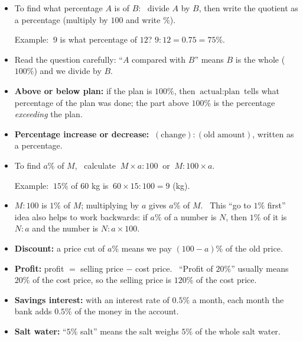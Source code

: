 \begin{knowbox}\begin{itemize}[leftmargin=1.4em,itemsep=3pt]
\item To find what percentage $A$ is of $B$: \ divide $A$ by $B$, then write the quotient as a percentage (multiply by $100$ and write $\%$).\par
Example: $\ 9$ is what percentage of $12$? \quad $9:12=0.75=75\%$.
\item Read the question carefully: ``$A$ compared with $B$'' means $B$ is the whole ($100\%$) and we divide by $B$.
\item \textbf{Above or below plan:} if the plan is $100\%$, then $\ \text{actual}:\text{plan}$ tells what percentage of the plan was done; the part above $100\%$ is the percentage \emph{exceeding} the plan.
\item \textbf{Percentage increase or decrease:} $\ (\text{change}):(\text{old amount})$, written as a percentage.
\end{itemize}
\end{knowbox}
\gap
{}
\begin{knowbox}\begin{itemize}[leftmargin=1.4em,itemsep=3pt]
\item To find $a\%$ of $M$, \ calculate $\ M\times a:100\ $ or $\ M:100\times a$.\par
Example: $\ 15\%$ of $60$ kg is $\ 60\times15:100=9$ (kg).
\item $M:100$ is $1\%$ of $M$; multiplying by $a$ gives $a\%$ of $M$. \ This ``go to $1\%$ first'' idea also helps to work backwards: if $a\%$ of a number is $N$, then $1\%$ of it is $N:a$ and the number is $N:a\times100$.
\end{itemize}
\end{knowbox}
\gap
{}
\begin{knowbox}\begin{itemize}[leftmargin=1.4em,itemsep=3pt]
\item \textbf{Discount:} a price cut of $a\%$ means we pay $(100-a)\%$ of the old price.
\item \textbf{Profit:} profit $=$ selling price $-$ cost price. \ ``Profit of $20\%$'' usually means $20\%$ of the cost price, so the selling price is $120\%$ of the cost price.
\item \textbf{Savings interest:} with an interest rate of $0.5\%$ a month, each month the bank adds $0.5\%$ of the money in the account.
\item \textbf{Salt water:} ``$5\%$ salt'' means the salt weighs $5\%$ of the whole salt water.
\end{itemize}
\end{knowbox}
